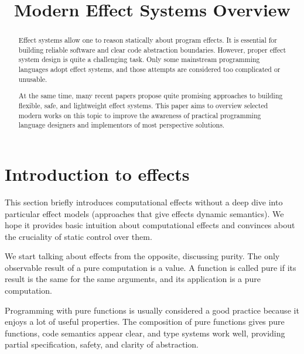 \documentclass[conference]{IEEEtran}
\begin{document}
    \title{Modern Effect Systems Overview
    }

    \author{
    }

    \maketitle


    \begin{abstract}
        Effect systems allow one to reason statically about program effects.
        It is essential for building reliable software and clear code abstraction boundaries.
        However, proper effect system design is quite a challenging task.
        Only some mainstream programming languages adopt effect systems, and those attempts are considered too complicated or unusable.

        At the same time, many recent papers propose quite promising approaches to building flexible, safe, and lightweight effect systems.
        This paper aims to overview selected modern works on this topic to improve the awareness of practical programming language designers and implementors of most perspective solutions.
    \end{abstract}


    \section{Introduction to effects}

    This section briefly introduces computational effects without a deep dive into particular effect models (approaches that give effects dynamic semantics).
    We hope it provides basic intuition about computational effects and convinces about the cruciality of static control over them.

    We start talking about effects from the opposite, discussing purity.
    The only observable result of a pure computation is a value.
    A function is called pure if its result is the same for the same arguments, and its application is a pure computation.

    Programming with pure functions is usually considered a good practice because it enjoys a lot of useful properties.
    The composition of pure functions gives pure functions, code semantics appear clear, and type systems work well, providing partial specification, safety, and clarity of abstraction.
\end{document}
